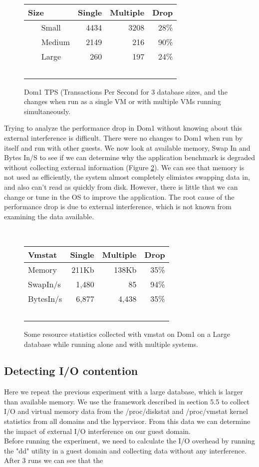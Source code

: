 \begin{figure}
  \begin{tabular}{ l | r | r | r }
    Size & Single & Multiple & Drop \\
    \hline
    Small & 4434 & 3208 & 28\% \\ \hline
    Medium & 2149 & 216 & 90\% \\ \hline
    Large & 260 & 197 & 24\% \\  \hline
  \end{tabular}
\caption{Dom1 TPS (Transactions Per Second for 3 database sizes, and the changes when run as a single VM or with multiple VMs running simultaneously.}
\label{fig:tps1}
\end{figure}

\indent Trying to analyze the performance drop in Dom1 without knowing about this external interference is difficult.  There were no changes to Dom1 when run by itself and run with other guests.  We now look at available memory, Swap In and Bytes In/S to see if we can determine why the application benchmark is degraded without collecting external information (Figure \ref{fig:vmstat}).  We can see that memory is not used as efficiently, the system almost completely elimiates swapping data in, and also can't read as quickly from disk.  However, there is little that we can change or tune in the OS to improve the application.  The root cause of the performance drop is due to external interference, which is not known from examining the data available.
\begin{figure}
  \begin{tabular}{ l | r | r | r }
    Vmstat & Single & Multiple & Drop \\ \hline
	Memory & 211Kb & 138Kb & 35\% \\
	SwapIn/s & 1,480 & 85 & 94\% \\
	BytesIn/s & 6,877 & 4,438 & 35\% \\
  \end{tabular}
\caption{Some resource statistics collected with vmstat on Dom1 on a Large database while running alone and with multiple systems.} 
\label{fig:vmstat}
\end{figure}

\subsection{Detecting I/O contention}
Here we repeat the previous experiment with a large database, which is larger than available memory. We use the framework described in section 5.5 to collect I/O and virtual memory data from the /proc/diskstat and /proc/vmstat kernel statistics from all domains and the hypervisor.  From this data we can determine the impact of external I/O interference on our guest domain.\\
Before running the experiment, we need to calculate the I/O overhead by running the "dd" utility in a guest domain and collecting data without any interference.  After 3 runs we can see that the 



